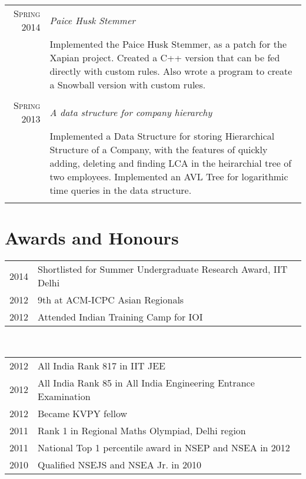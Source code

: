 \documentclass[a4paper,10pt]{article} %
\begin{document}
\begin{tabular}{r|p{11cm}}

\textsc{Spring 2014}& \emph{Paice Husk Stemmer}\\ 
 & \footnotesize{Implemented the Paice Husk Stemmer, as a patch for the Xapian project. Created a C++ version that can be fed directly with custom rules. Also wrote a program to create a Snowball version with custom rules. }\\
\multicolumn{2}{c}{}\\



\textsc{Spring 2013} & \emph{A data structure for company hierarchy}\\ 
& \footnotesize{Implemented a Data Structure for storing Hierarchical Structure of a Company, with the features of quickly adding, deleting and finding LCA in the heirarchial tree of two employees. Implemented an AVL Tree for logarithmic time queries in the data structure.}\\
\multicolumn{2}{c}{} 

\end{tabular}



\section{Awards and Honours}

\begin{tabular}{rl}
2014 & Shortlisted for Summer Undergraduate Research Award, IIT Delhi\\
2012 & 9th at ACM-ICPC Asian Regionals\\
2012 & Attended Indian Training Camp for IOI\\
\end{tabular}\\
\begin{tabular}{rl}
2012 & All India Rank 817 in IIT JEE\\
2012 & All India Rank 85 in All India Engineering Entrance Examination\\
2012 & Became KVPY fellow\\
2011 & Rank 1 in Regional Maths Olympiad, Delhi region\\
2011 & National Top 1 percentile award in NSEP and NSEA in 2012\\
2010 & Qualified NSEJS and NSEA Jr. in 2010\\

\end{tabular}
\end{document}
